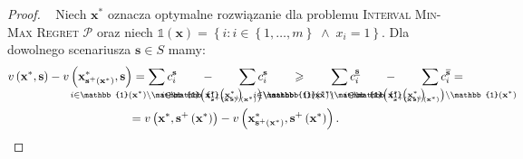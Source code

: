 \begin{proof}~\cite[$432$]{minmaxSurvey}
	Niech $\textbf{x}^{\ast}$ oznacza optymalne rozwiązanie dla problemu \textsc{Interval Min-Max Regret $\mathcal{P}$} oraz niech $\mathbb{1} \left( \textbf{x} \right) = \left\{ i : i \in \left\{ 1, \dots, m \right\} \; \wedge \; x_{i} = 1 \right\}$.
	Dla dowolnego scenariusza $\textbf{s} \in S$ mamy:
	\begin{gather*}
		v \left( \textbf{x}^{\ast}, \textbf{s} \right) - v \left( \textbf{x}^{\ast}_{\textbf{s}^{+} \left( \textbf{x}^{\ast} \right)}, \textbf{s} \right) = \sum_{\mathclap{i \in \mathbb{1} \left( \textbf{x}^{\ast} \right) \setminus \mathbb{1} \left( \textbf{x}^{\ast}_{\textbf{s}^{+} \left( \textbf{x}^{\ast} \right)} \right)}} c_{i}^{\textbf{s}} \qquad - \qquad \sum_{\mathclap{i \in \mathbb{1} \left( \textbf{x}^{\ast}_{\textbf{s}^{+} \left( \textbf{x}^{\ast} \right)} \right) \setminus \mathbb{1} \left( \textbf{x}^{\ast} \right)}} c_{i}^{\textbf{s}} \qquad \geqslant \qquad \sum_{\mathclap{i \in \mathbb{1} \left( \textbf{x}^{\ast} \right) \setminus \mathbb{1} \left( \textbf{x}^{\ast}_{\textbf{s}^{+} \left( \textbf{x}^{\ast} \right)} \right)}} c^{\underline{\textbf{s}}}_{i} \qquad - \qquad \sum_{\mathclap{i \in \mathbb{1} \left( \textbf{x}^{\ast}_{\textbf{s}^{+} \left( \textbf{x}^{\ast} \right)} \right) \setminus \mathbb{1} \left( \textbf{x}^{\ast} \right)}} c^{\overline{\textbf{s}}}_{i} = \\
		= v \left( \textbf{x}^{\ast}, \textbf{s}^{+} \left( \textbf{x}^{\ast} \right) \right) - v \left( \textbf{x}^{\ast}_{\textbf{s}^{+} \left( \textbf{x}^{\ast} \right)}, \textbf{s}^{+} \left( \textbf{x}^{\ast} \right) \right)\text{.}
	\end{gather*}
	

\end{proof}
